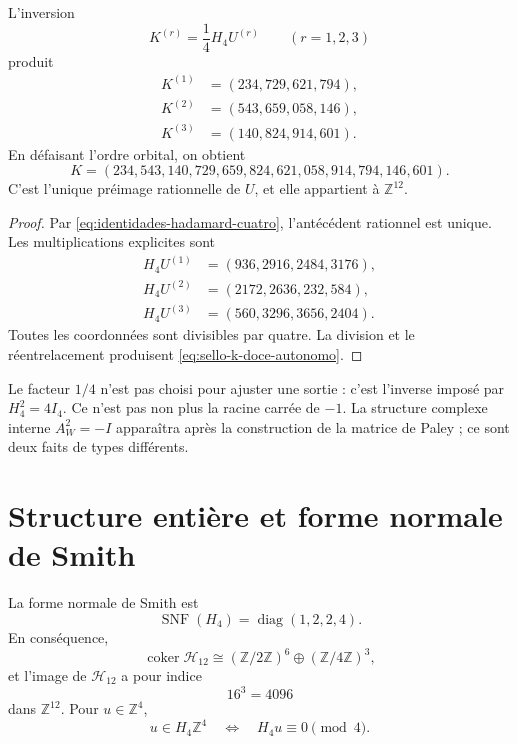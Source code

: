 \begin{theorem}
\label{thm:reconstruccion-entera-k-hadamard}
L’inversion
\begin{equation}
 K^{(r)}=\frac14H_4U^{(r)}
 \qquad(r=1,2,3)
 \label{eq:inversion-bloques-hadamard}
\end{equation}
produit
\begin{align*}
 K^{(1)}&=(234,729,621,794),\\
 K^{(2)}&=(543,659,058,146),\\
 K^{(3)}&=(140,824,914,601).
\end{align*}
En défaisant l’ordre orbital, on obtient
\begin{equation}
 \boxed{
 K=(234,543,140,729,659,824,621,058,914,794,146,601).}
 \label{eq:sello-k-doce-autonomo}
\end{equation}
C'est l'unique préimage rationnelle de \(U\), et elle appartient à \(\mathbb Z^{12}\).
\end{theorem}

\begin{proof}
Par \eqref{eq:identidades-hadamard-cuatro}, l’antécédent rationnel est unique.
Les multiplications explicites sont
\begin{align*}
 H_4U^{(1)}&=(936,2916,2484,3176),\\
 H_4U^{(2)}&=(2172,2636,232,584),\\
 H_4U^{(3)}&=(560,3296,3656,2404).
\end{align*}
Toutes les coordonnées sont divisibles par quatre. La division et le réentrelacement
produisent \eqref{eq:sello-k-doce-autonomo}.
\end{proof}

Le facteur \(1/4\) n’est pas choisi pour ajuster une sortie : c’est l’inverse
imposé par \(H_4^2=4I_4\). Ce n’est pas non plus la racine carrée de \(-1\). La
structure complexe interne \(A_W^2=-I\) apparaîtra après la construction de la
matrice de Paley ; ce sont deux faits de types différents.

\section{Structure entière et forme normale de Smith}

\begin{theorem}
\label{thm:smith-hadamard-autonomo}
La forme normale de Smith est
\begin{equation}
 \operatorname{SNF}(H_4)=\operatorname{diag}(1,2,2,4).
 \label{eq:snf-hadamard-autonoma}
\end{equation}
En conséquence,
\begin{equation}
 \operatorname{coker}\mathcal H_{12}
 \cong(\mathbb Z/2\mathbb Z)^6
 \oplus(\mathbb Z/4\mathbb Z)^3,
 \label{eq:cociente-hadamard-doce}
\end{equation}
et l’image de \(\mathcal H_{12}\) a pour indice
\[
 16^3=4096
\]
dans \(\mathbb Z^{12}\). Pour \(u\in\mathbb Z^4\),
\begin{equation}
 u\in H_4\mathbb Z^4
 \quad\Longleftrightarrow\quad
 H_4u\equiv0\pmod4.
 \label{eq:criterio-imagen-hadamard}
\end{equation}
\end{theorem}

